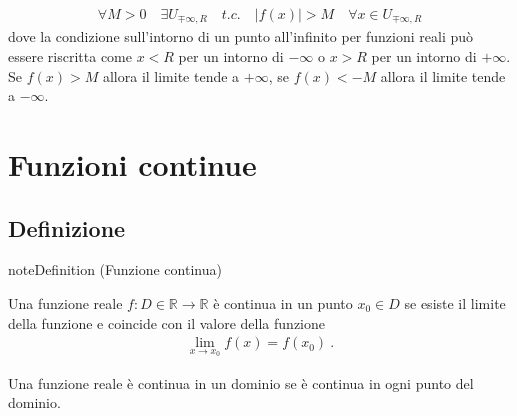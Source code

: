 \documentclass[letterpaper,10pt,italian]{jupyterBook}
\begin{document}
\sphinxAtStartPar
{}
\begin{equation*}
\begin{split}\forall M > 0 \quad \exists U_{\mp \infty, R} \quad {t.c.} \quad |f(x)| > M \quad \forall x \in U_{\mp \infty, R}\end{split}
\end{equation*}
\sphinxAtStartPar
dove la condizione sull’intorno di un punto all’infinito per funzioni reali può essere riscritta come \(x < R\) per un intorno di \(-\infty\) o \(x > R\) per un intorno di \(+\infty\). Se \(f(x) > M\) allora il limite tende a \(+\infty\), se \(f(x) < -M\) allora il limite tende a \(-\infty\).


\section{Funzioni continue}
\label{\detokenize{ch/infinitesimal_calculus/analysis:funzioni-continue}}\label{\detokenize{ch/infinitesimal_calculus/analysis:infinitesimal-calculus-continuous-fun}}

\subsection{Definizione}
\label{\detokenize{ch/infinitesimal_calculus/analysis:definizione}}\label{\detokenize{ch/infinitesimal_calculus/analysis:infinitesimal-calculus-continuous-fun-def}}\label{None:analysis-continuous-fun}
\begin{sphinxadmonition}{note}{Definition  (Funzione continua)}



\sphinxAtStartPar
Una funzione reale \(f: D \in \mathbb{R} \rightarrow \mathbb{R}\) è continua in un punto \(x_0 \in D\)  se esiste il limite della funzione e coincide con il valore della funzione
\begin{equation*}
\begin{split}\lim_{x \rightarrow x_0} f(x) = f(x_0) \ .\end{split}
\end{equation*}\end{sphinxadmonition}

\sphinxAtStartPar
Una funzione reale è continua in un dominio  se è continua in ogni punto del dominio.
\end{document}
